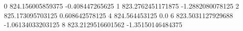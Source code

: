 0 824.156005859375 -0.408447265625
1 823.2762451171875 -1.2882080078125
2 825.173095703125 0.608642578125
4 824.564453125 0.0
6 823.5031127929688 -1.06134033203125
8 823.2129516601562 -1.35150146484375
